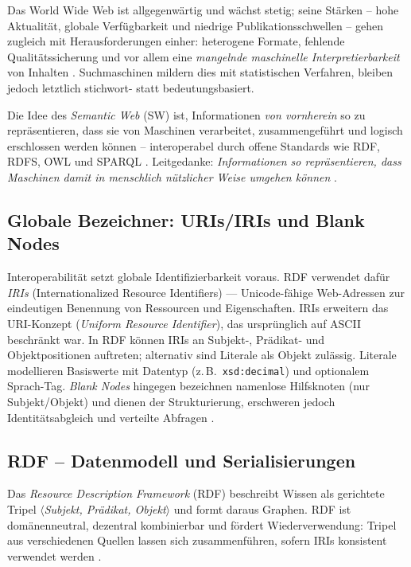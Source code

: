 Das World Wide Web ist allgegenwärtig und wächst stetig; seine Stärken -- hohe Aktualität, globale Verfügbarkeit und niedrige Publikationsschwellen -- gehen zugleich mit Herausforderungen einher: heterogene Formate, fehlende Qualitätssicherung und vor allem eine \emph{mangelnde maschinelle Interpretierbarkeit} von Inhalten \cite{Hitzler}. Suchmaschinen mildern dies mit statistischen Verfahren, bleiben jedoch letztlich stichwort- statt bedeutungsbasiert. 

Die Idee des \emph{Semantic Web} (SW) ist, Informationen \emph{von vornherein} so zu repräsentieren, dass sie von Maschinen verarbeitet, zusammengeführt und logisch erschlossen werden können -- interoperabel durch offene Standards wie RDF, RDFS, OWL und SPARQL \cite{Hitzler,AntoniouVanHarmelen}. Leitgedanke: \emph{Informationen so repräsentieren, dass Maschinen damit in menschlich nützlicher Weise umgehen können} \cite{Hitzler}.


\subsection{Globale Bezeichner: URIs/IRIs und Blank Nodes}

Interoperabilität setzt globale Identifizierbarkeit voraus. RDF verwendet dafür \emph{IRIs} (Internationalized Resource Identifiers) — Unicode-fähige Web-Adressen zur eindeutigen Benennung von Ressourcen und Eigenschaften. IRIs erweitern das URI-Konzept (\emph{Uniform Resource Identifier}), das ursprünglich auf ASCII beschränkt war. In RDF können IRIs an Subjekt-, Prädikat- und Objektpositionen auftreten; alternativ sind Literale als Objekt zulässig. Literale modellieren Basiswerte mit Datentyp (z.\,B.\ \texttt{xsd:decimal}) und optionalem Sprach-Tag. \emph{Blank Nodes} hingegen bezeichnen namenlose Hilfsknoten (nur Subjekt/Objekt) und dienen der Strukturierung, erschweren jedoch Identitätsabgleich und verteilte Abfragen \cite{RDF11Primer,Hitzler}.

\subsection{RDF -- Datenmodell und Serialisierungen}
\label{subsec:rdf}

Das \emph{Resource Description Framework} (RDF) beschreibt Wissen als gerichtete Tripel
\(\langle\)\emph{Subjekt, Prädikat, Objekt}\(\rangle\) und formt daraus Graphen. RDF ist domänenneutral, dezentral kombinierbar und fördert Wiederverwendung: Tripel aus verschiedenen Quellen lassen sich zusammenführen, sofern IRIs konsistent verwendet werden \cite{RDF11Primer,AntoniouVanHarmelen,Hitzler}.

